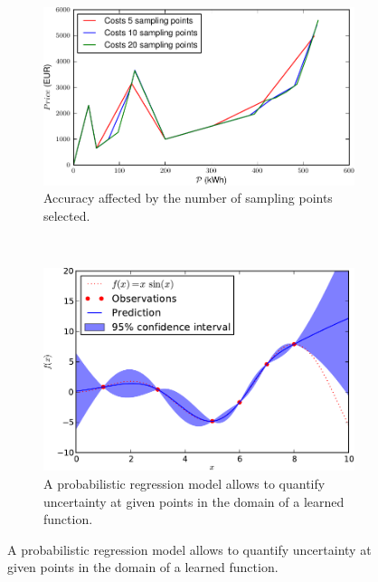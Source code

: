 \documentclass[conference]{IEEEtran}
\begin{document}
\begin{figure}
        \centering
        \begin{subfigure}[b]{0.4\textwidth}
        \centering
                \includegraphics[width=\textwidth]{img/costs}
                \caption{Accuracy affected by the number of sampling points selected.}
                \label{fig:sampling}
        \end{subfigure}%
        ~ \qquad%
        \begin{subfigure}[b]{0.4\textwidth}
        \centering
                \includegraphics[width=\textwidth]{img/gaussProc}
                \caption{A probabilistic regression model allows to quantify uncertainty at given points in the domain of a learned function.}
                \label{fig:mouse}
        \end{subfigure}
\end{figure}
\end{document}
